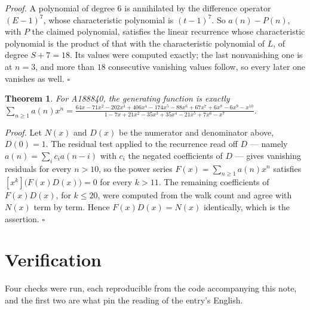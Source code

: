 \documentclass[11pt]{article}
\newtheorem{theorem}{Theorem}
\theoremstyle{definition}
\begin{document}
{\itshape Proof.} A polynomial of degree $6$ is annihilated by the difference operator $(E-1)^{7}$, whose characteristic polynomial is $(t-1)^{7}$. So $a(n) - P(n)$, with $P$ the claimed polynomial, satisfies the linear recurrence whose characteristic polynomial is the product of that with the characteristic polynomial of $L$, of degree $S + 7 = 18$. Its values were computed exactly; the last nonvanishing one is at $n = 3$, and more than $18$ consecutive vanishing values follow, so every later one vanishes as well. $\square$

\begin{theorem} For A188840, the generating function is exactly $\sum_{n\ge 1} a(n)x^n = \frac{64x - 71x^{2} - 202x^{3} + 406x^{4} - 174x^{5} - 88x^{6} + 67x^{7} + 6x^{8} - 6x^{9} - x^{10}}{1 - 7x + 21x^{2} - 35x^{3} + 35x^{4} - 21x^{5} + 7x^{6} - x^{7}}$.\end{theorem}

{\itshape Proof.} Let $N(x)$ and $D(x)$ be the numerator and denominator above, $D(0)=1$. The residual test applied to the recurrence read off $D$ --- namely $a(n) = \sum_i c_i a(n-i)$ with $c_i$ the negated coefficients of $D$ --- gives vanishing residuals for every $n > 10$, so the power series $F(x)=\sum_{n\ge 1}a(n)x^n$ satisfies $[x^k]\bigl(F(x)D(x)\bigr) = 0$ for every $k > 11$. The remaining coefficients of $F(x)D(x)$, for $k \le 20$, were computed from the walk count and agree with $N(x)$ term by term. Hence $F(x)D(x) = N(x)$ identically, which is the assertion. $\square$

\section{Verification}

Four checks were run, each reproducible from the code accompanying this note, and the first two are what pin the reading of the entry's English.
\end{document}

